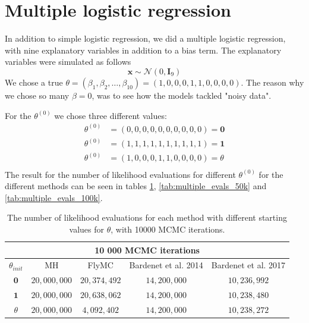 \section{Multiple logistic regression}\label{sec:experiments_multiple_log_reg}
In addition to simple logistic regression, we did a multiple logistic regression, with nine explanatory variables in addition to a bias term. The explanatory variables  
were simulated as follows
\begin{equation*}
    \mathbf{x} \sim \mathcal{N}\left(0,\mathbf{I}_9\right)
\end{equation*}
We chose a true $\theta = \left(\beta_1, \beta_2, \ldots, \beta_{10}\right) = \left(1, 0, 0 , 0, 1, 1, 0, 0, 0, 0\right)$. The reason why we chose so many $\beta = 0$, was to see how the models tackled "noisy data". 

For the $\theta^{\left(0\right)}$ we chose three different values: 
\begin{equation*}
\begin{split}
    \theta^{\left(0\right)} &= \left(0, 0, 0, 0, 0, 0, 0, 0, 0, 0\right) = \mathbf{0} \\
    \theta^{\left(0\right)} & = \left(1, 1, 1, 1, 1, 1, 1, 1, 1, 1 \right) = \mathbf{1} \\
    \theta^{\left(0\right)} & = \left(1, 0, 0, 0, 1, 1, 0, 0, 0, 0\right) = \theta \\
    \end{split}
\end{equation*}
The result for the number of likelihood evaluations for different $\theta^{\left(0\right)}$ for the different methods can be seen in tables \ref{tab:multiple_evals_10k}, \ref{tab:multiple_evals_50k} and \ref{tab:multiple_evals_100k}. 

\begin{table}
    \centering
\begin{tabular}{|c|c|c|c|c|}
  \hline
    \multicolumn{5}{|c|}{10 000 MCMC iterations} \\
    \hline
\hline

        $\theta_{init}$ &  MH & FlyMC & Bardenet et al. 2014 & Bardenet et al. 2017\\ 
         \hline \hline$\mathbf{0}$ & $20,000,000$ & $20,374,492$ & $14,200,000$ & $10,236,992$ \\
        $\mathbf{1}$ & $20,000,000$ & $20,638,062$ & $14,200,000$ & $10,238,480$ \\
        $\theta$ & $20,000,000$ & $4,092,402$ & $14,200,000$ & $10,238,272$
       
        \\ \hline
\end{tabular}
\caption{The number of likelihood evaluations for each method with different starting values for $\theta$, with 10000 MCMC iterations.}
\label{tab:multiple_evals_10k}
\end{table} 

